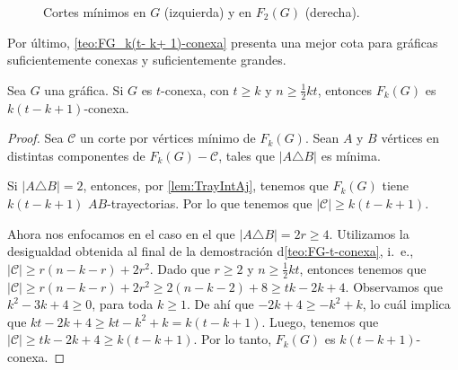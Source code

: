\begin{figure}[ht!]
    \caption{Cortes m\'inimos en $G$ (izquierda) y en $F_2(G)$ (derecha).}
    \label{fig:ex-tConect}
    \end{figure}

Por \'ultimo, \cref{teo:FG_k(t- k+ 1)-conexa} presenta una mejor cota para
gr\'aficas suficientemente conexas y suficientemente grandes.

\begin{teorema}%
    \label{teo:FG_k(t- k+ 1)-conexa}
        Sea $G$ una gr\'afica. Si $G$ es $t$-conexa, con $t \ge k$ y $n \ge
        \frac{1}{2} kt$, entonces $F_{k}(G)$ es $k (t- k+ 1)$-conexa.
    \end{teorema}

    \begin{proof}
        Sea $\mathcal{C}$ un corte por v\'ertices m\'inimo de $F_k(G)$. Sean $A$
        y $B$ v\'ertices en distintas componentes de $F_k(G)- \mathcal{C}$,
        tales que $|A \triangle B|$ es m\'inima.

        Si $|A \triangle B| = 2$, entonces, por \cref{lem:TrayIntAj}, tenemos
        que $F_k(G)$ tiene $k (t- k+ 1)$ $AB$-trayectorias. Por lo que tenemos
        que $|\mathcal{C}| \geq k (t- k+ 1)$.

        Ahora nos enfocamos en el caso en el que $|A \triangle B| = 2r \ge 4$.
        Utilizamos la desigualdad obtenida al final de la demostraci\'on
        d\cref{teo:FG-t-conexa}, i.~e., $|\mathcal{C}| \ge r(n-k-r)+2r^2$. Dado
        que $r \ge 2$ y $n \ge \frac{1}{2}kt$, entonces tenemos que
        $|\mathcal{C}| \ge r(n-k-r)+2r^2 \ge 2 (n- k -2) + 8 \ge tk - 2k+ 4$.
        Observamos que $k^2 -3k + 4 \ge 0$, para toda $k \ge 1$. De ah\'i que
        $-2k+4 \ge -k^2 + k$, lo cu\'al implica que $kt -2k +4 \ge kt - k^2 + k
        = k (t - k +1)$. Luego, tenemos que $|\mathcal{C}| \ge tk -2k +4 \ge
        k(t-k+1)$. Por lo tanto, $F_k(G)$ es $k(t-k+1)$-conexa.
    \end{proof}